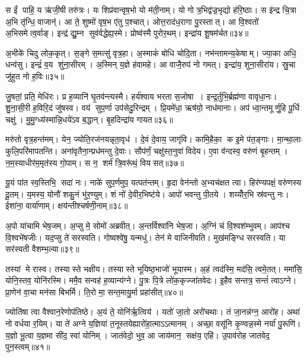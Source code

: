 स ईं पाहि॒ य ऋ॑जी॒षी तरु॑त्रः। यः शिप्र॑वान्वृष॒भो यो म॑ती॒नाम्। यो गोत्र॒भिद्व॑ज्र॒भृद्यो ह॑रि॒ष्ठाः। स इ॑न्द्र चि॒त्रा अ॒भि तृ॑न्धि॒ वाजान्॑। आ ते॒ शुष्मो॑ वृष॒भ ए॑तु प॒श्चात्। ओत्त॒राद॑ध॒रागा पु॒रस्तात्। आ वि॒श्वतो॑ अ॒भिसमेत्व॒र्वाङ्। इन्द्र॑ द्यु॒म्न सुव॑र्वद्धेह्य॒स्मे। प्रोष्व॑स्मै पुरोर॒थम्। इन्द्रा॑य शू॒षम॑र्चत॥३४॥

अ॒भीके॑ चिदु लोक॒कृत्। स॒ङ्गे स॒मत्सु॑ वृत्र॒हा। अ॒स्माकं॑ बोधि चोदि॒ता। नभ॑न्तामन्य॒केषाम्। ज्या॒का अधि॒ धन्व॑सु। इन्द्रं॑ व॒य शु॑ना॒सीरम्। अ॒स्मिन् य॒ज्ञे ह॑वामहे। आ वाजै॒रुप॑ नो गमत्। इन्द्रा॑य॒ शुना॒सीरा॑य। स्रु॒चा जु॑हुत नो ह॒विः॥३५॥

जु॒षतां॒ प्रति॒ मेधि॑रः। प्र ह॒व्यानि॑ घृ॒तव॑न्त्यस्मै। हर्य॑श्वाय भरता स॒जोषा। इन्द्र॒र्तुभि॒र्ब्रह्म॑णा वावृधा॒नः। शु॒ना॒सी॒री ह॒विरि॒दं जु॑षस्व। वय॑ सुप॒र्णा उप॑सेदु॒रिन्द्रम्। प्रि॒यमे॑धा॒ ऋष॑यो॒ नाध॑मानाः। अप॑ ध्वा॒न्तमूर्णु॒हि पू॒र्धि चक्षु॑। मु॒मु॒ग्ध्य॑स्मान्नि॒धये॑ऽव ब॒द्धान्। बृ॒हदिन्द्रा॑य गायत॥३६॥

मरु॑तो वृत्र॒हन्त॑मम्। येन॒ ज्योति॒रज॑नयन्नृता॒वृध॑। दे॒वं दे॒वाय॒ जागृ॑वि। कामि॒हैका॒ क इ॒मे प॑त॒ङ्गाः। मा॒न्था॒लाः कुलि॒परि॑मापतन्ति। अना॑वृतैना॒न्प्रध॑मन्तु दे॒वाः। सौप॑र्णं॒ चक्षु॑स्त॒नुवा॑ विदेय। ए॒वा व॑न्दस्व॒ वरु॑णं बृ॒हन्तम्। न॒म॒स्याधीर॑म॒मृत॑स्य गो॒पाम्। स न॒ शर्म॑ त्रि॒वरू॑थं॒ वियसत्॥३७॥

यू॒यं पा॑त स्व॒स्तिभि॒ सदा॑ नः। नाके॑ सुप॒र्णमुप॒ यत्पत॑न्तम्। हृ॒दा वेन॑न्तो अ॒भ्यच॑क्षत त्वा। हिर॑ण्यपक्षं॒ वरु॑णस्य दू॒तम्। य॒मस्य॒ योनौ॑ शकु॒नं भु॑र॒ण्युम्। शं नो॑ दे॒वीर॒भिष्ट॑ये। आपो॑ भवन्तु पी॒तये। शय्योँर॒भि स्र॑वन्तु नः। ईशा॑ना॒ वार्या॑णाम्। क्षय॑न्तीश्चर्\mbox{}षणी॒नाम्॥३८॥

अ॒पो या॑चामि भेष॒जम्। अ॒प्सु मे॒ सोमो॑ अब्रवीत्। अ॒न्तर्विश्वा॑नि भेष॒जा। अ॒ग्निं च॑ वि॒श्वश॑म्भुवम्। आप॑श्च वि॒श्वभे॑षजीः। यद॒प्सु ते॑ सरस्वति। गोष्वश्वे॑षु॒ यन्मधु॑। तेन॑ मे वाजिनीवति। मुख॑मङ्ग्धि सरस्वति। या सर॑स्वती वैशम्भ॒ल्या॥३९॥

तस्यां मे रास्व। तस्यास्ते भक्षीय। तस्यास्ते भूयिष्ठ॒भाजो॑ भूयास्म। अ॒हं त्वद॑स्मि॒ मद॑सि॒ त्वमे॒तत्। ममा॑सि॒ योनि॒स्तव॒ योनि॑रस्मि। ममै॒व सन्वह॑ ह॒व्यान्य॑ग्ने। पु॒त्रः पि॒त्रे लो॑क॒कृज्जा॑तवेदः। इ॒हैव सन्तत्र॒ सन्तं॑ त्वाऽग्ने। प्रा॒णेन॑ वा॒चा मन॑सा बिभर्मि। ति॒रो मा॒ सन्त॒मायु॒र्मा प्रहा॑सीत्॥४०॥

ज्योति॑षा त्वा वैश्वान॒रेणोप॑तिष्ठे। अ॒यं ते॒ योनि॑र्\mbox{}ऋ॒त्विय॑। यतो॑ जा॒तो अरो॑चथाः। तं जा॒नन्न॑ग्न॒ आरो॑ह। अथा॑ नो वर्धया र॒यिम्। या ते॑ अग्ने य॒ज्ञिया॑ त॒नूस्तयेह्यारो॑हा॒त्माऽऽत्मानम्। अच्छा॒ वसू॑नि कृ॒ण्वन्न॒स्मे नर्या॑ पु॒रूणि॑। य॒ज्ञो भू॒त्वा य॒ज्ञमा सी॑द॒ स्वां योनिम्। जात॑वेदो॒ भुव॒ आ जाय॑मान॒ सक्ष॑य॒ एहि॑। उ॒पाव॑रोह जातवेद॒ पुन॒स्त्वम्॥४१॥

